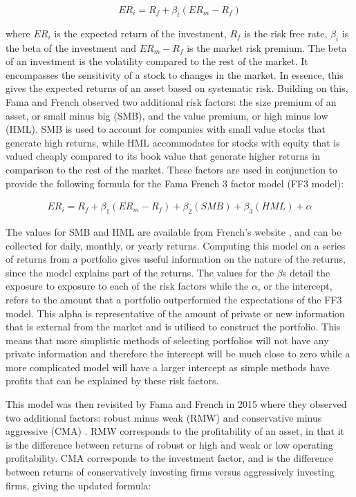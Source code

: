 \begin{equation}
ER_i = R_f + \beta_t (ER_m - R_f)
\end{equation}

\noindent
where $ER_i$ is the expected return of the investment, $R_f$ is the risk free rate, $\beta_i$ is the beta of the investment and $ER_m - R_f$ is the market risk premium. The beta of an investment is the volatility compared to the rest of the market. It encompasses the sensitivity of a stock to changes in the market. In essence, this gives the expected returns of an asset based on systematic risk. Building on this, Fama and French observed two additional risk factors: the size premium of an asset, or small minus big (SMB), and the value premium, or high minus low (HML). SMB is used to account for companies with small value stocks that generate high returns, while HML accommodates for stocks with equity that is valued cheaply compared to its book value that generate higher returns in comparison to the rest of the market. These factors are used in conjunction to provide the following formula for the Fama French 3 factor model (FF3 model):

\begin{align*}
ER_i = R_f + \beta_1(ER_m -R_f) + \beta_2 (SMB) + \beta_3(HML) + \alpha
\end{align*}

The values for SMB and HML are available from French's website \parencite{french_2022}, and can be collected for daily, monthly, or yearly returns. Computing this model on a series of returns from a portfolio gives useful information on the nature of the returns, since the model explains part of the returns. The values for the $\beta$s detail the exposure to exposure to each of the risk factors while the $\alpha$, or the intercept, refers to the amount that a portfolio outperformed the expectations of the FF3 model. This alpha is representative of the amount of private or new information that is external from the market and is utilised to construct the portfolio. This means that more simplistic methods of selecting portfolios will not have any private information and therefore the intercept will be much close to zero while a more complicated model will have a larger intercept as simple methods have profits that can be explained by these risk factors.

This model was then revisited by Fama and French in 2015 where they observed two additional factors: robust minus weak (RMW) and conservative minus aggressive (CMA) \parencite{ff5}. RMW corresponds to the profitability of an asset, in that it is the difference between returns of robust or high and weak or low operating profitability. CMA corresponds to the investment factor, and is the difference between returns of conservatively investing firms versus aggressively investing firms, giving the updated formula:

